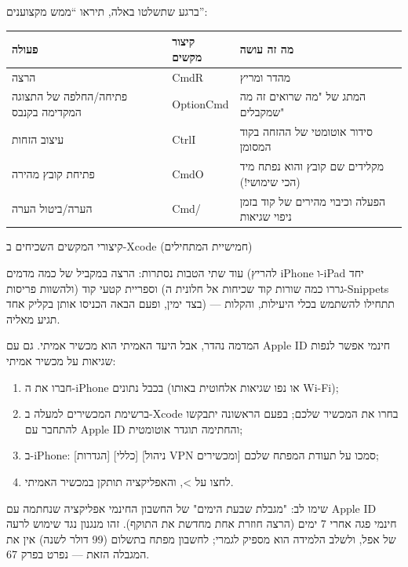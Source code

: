 

ברגע שתשלטו באלה, תיראו “ממש מקצוענים”:

\begin{center}
\begin{tabularx}{\linewidth}{|X|X|X|}
\hline
\textbf{פעולה} & \textbf{קיצור מקשים} & \textbf{מה זה עושה} \tabularnewline
\hline
הרצה & CmdR & מהדר ומריץ \tabularnewline
פתיחה/החלפה של התצוגה המקדימה בקנבס & OptionCmd & המתג של "מה שרואים זה מה שמקבלים" \tabularnewline
עיצוב הזחות & CtrlI & סידור אוטומטי של ההזחה בקוד המסומן \tabularnewline
פתיחת קובץ מהירה & CmdO & מקלידים שם קובץ והוא נפתח מיד (הכי שימושי!) \tabularnewline
הערה/ביטול הערה & Cmd/ & הפעלה וכיבוי מהירים של קוד בזמן ניפוי שגיאות \tabularnewline
\hline
\end{tabularx}
\end{center}

\begin{center}\small\color{gray}קיצורי המקשים השכיחים ב-Xcode (חמישיית המתחילים)\end{center}

עוד שתי הטבות נסתרות: הרצה במקביל של כמה מדמים (להריץ iPhone ו-iPad יחד ולהשוות פריסות) וספריית קטעי קוד (גררו כמה שורות קוד שכיחות אל חלונית ה-Snippets בצד ימין, ופעם הבאה הכניסו אותן בקליק אחד) — תתחילו להשתמש בכלי היעילות, והקלות תגיע מאליה.


המדמה נהדר, אבל היעד האמיתי הוא מכשיר אמיתי. גם עם Apple ID חינמי אפשר לנפות שגיאות על מכשיר אמיתי:

\begin{enumerate}
  \item חברו את ה-iPhone בכבל נתונים (או נפו שגיאות אלחוטית באותו Wi-Fi);
  \item ברשימת המכשירים למעלה ב-Xcode בחרו את המכשיר שלכם; בפעם הראשונה יתבקשו להתחבר עם Apple ID והחתימה תוגדר אוטומטית;
  \item ב-iPhone: [הגדרות] [כללי] [ניהול VPN ומכשירים] סמכו על תעודת המפתח שלכם;
  \item לחצו על >, והאפליקציה תותקן במכשיר האמיתי.
\end{enumerate}

\begin{tcbwarn}{שימו לב: "מגבלת שבעת הימים" של החשבון החינמי}
אפליקציה שנחתמה עם Apple ID חינמי פגה אחרי 7 ימים (הרצה חוזרת אחת מחדשת את התוקף). זהו מנגנון נגד שימוש לרעה של אפל, ולשלב הלמידה הוא מספיק לגמרי; לחשבון מפתח בתשלום (99 דולר לשנה) אין את המגבלה הזאת — נפרט בפרק 67.

\end{tcbwarn}


